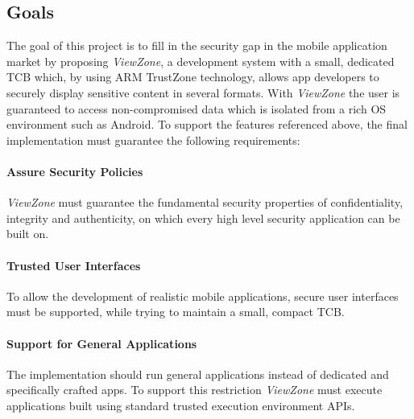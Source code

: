 \subsection{Goals}



The goal of this project is to fill in the security gap in the mobile application market by proposing \emph{ViewZone}, a development system with a small, dedicated \ac{TCB} which, by using ARM TrustZone technology, allows app developers to securely display sensitive content in several formats. With \emph{ViewZone} the user is guaranteed  to access non-compromised data which is isolated from a rich OS environment such as Android.
%
To support the features referenced above, the final implementation must guarantee the following requirements:
%
\paragraph*{\textbf{Assure Security Policies\\}} \emph{ViewZone} must guarantee the fundamental security properties of confidentiality, integrity and authenticity, on which every high level security application can be built on.

\paragraph*{\textbf{Trusted User Interfaces\\}} To allow the development of realistic mobile applications, secure user interfaces must be supported, while trying to maintain a small, compact \ac{TCB}.

\paragraph*{\textbf{Support for General Applications\\}} The implementation should run general applications instead of dedicated and specifically crafted apps. To support this restriction \emph{ViewZone} must execute applications built using standard trusted execution environment APIs.

